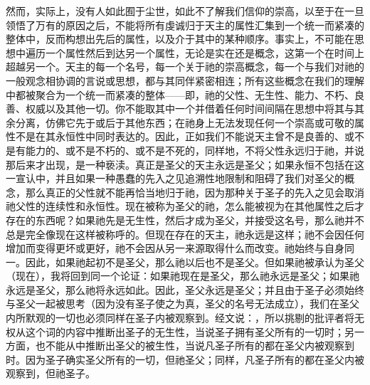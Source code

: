 然而，实际上，没有人如此囿于尘世，如此不了解我们信仰的崇高，以至于在一旦领悟了万有的原因之后，不能将所有虔诚归于天主的属性汇集到一个统一而紧凑的整体中，反而构想出先后的属性，以及介于其中的某种顺序。事实上，不可能在思想中遍历一个属性然后到达另一个属性，无论是实在还是概念，这第一个在时间上超越另一个。天主的每一个名号，每一个关于祂的崇高概念，每一个与我们对祂的一般观念相协调的言说或思想，都与其同伴紧密相连；所有这些概念在我们的理解中都被聚合为一个统一而紧凑的整体——即，祂的父性、无生性、能力、不朽、良善、权威以及其他一切。你不能取其中一个并借着任何时间间隔在思想中将其与其余分离，仿佛它先于或后于其他东西；在祂身上无法发现任何一个崇高或可敬的属性不是在其永恒性中同时表达的。因此，正如我们不能说天主曾不是良善的、或不是有能力的、或不是不朽的、或不是不死的，同样地，不将父性永远归于祂，并说那后来才出现，是一种亵渎。真正是圣父的天主永远是圣父；如果永恒不包括在这一宣认中，并且如果一种愚蠢的先入之见追溯性地限制和阻碍了我们对圣父的概念，那么真正的父性就不能再恰当地归于祂，因为那种关于圣子的先入之见会取消祂父性的连续性和永恒性。现在被称为圣父的祂，怎么能被视为在其他属性之后才存在的东西呢？如果祂先是无生性，然后才成为圣父，并接受这名号，那么祂并不总是完全像现在这样被称呼的。但现在存在的天主，祂永远是这样；祂不会因任何增加而变得更坏或更好，祂不会因从另一来源取得什么而改变。祂始终与自身同一。因此，如果祂起初不是圣父，那么祂以后也不是圣父。但如果祂被承认为圣父（现在），我将回到同一个论证：如果祂现在是圣父，那么祂永远是圣父；如果祂永远是圣父，那么祂将永远如此。因此，圣父永远是圣父；并且由于圣子必须始终与圣父一起被思考（因为没有圣子使之为真，圣父的名号无法成立），我们在圣父内所默观的一切也必须同样在圣子内被观察到。经文说：，所以挑剔的批评者将无权从这个词的内容中推断出圣子的无生性，当说圣子拥有圣父所有的一切时；另一方面，也不能从中推断出圣父的被生性，当说凡圣子所有的都在圣父内被观察到时。因为圣子确实圣父所有的一切，但祂圣父；同样，凡圣子所有的都在圣父内被观察到，但祂圣子。\par

